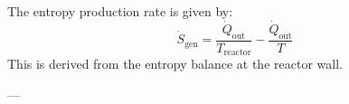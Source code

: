 The entropy production rate is given by:  
\[
\dot{S}_{\text{gen}} = \frac{\dot{Q}_{\text{out}}}{T_{\text{reactor}}} - \frac{\dot{Q}_{\text{out}}}{T}
\]  
This is derived from the entropy balance at the reactor wall.  

---